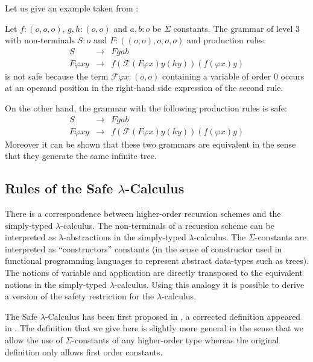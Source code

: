 Let us give an example taken from \cite{KNU02}:
\begin{exmp} Let $f:(o,o,o)$, $g,h:(o,o)$ and $a,b:o$ be $\Sigma$ constants.
 The grammar of level 3 with non-terminals $S:o$ and $F: ((o,o),o,o,o)$ and production rules:
\begin{eqnarray*}
    S &\rightarrow&  F g a b \\
    F \varphi x y &\rightarrow& f ( \mathcal{F} ( F \varphi x ) y (h y)) (f (\varphi x) y)
\end{eqnarray*}
is not safe because the term $\mathcal{F} \varphi x : (o,o)$ containing a variable of order $0$
occurs at an operand position in the right-hand side expression of the second rule.

On the other hand, the grammar with the following production rules is safe:
\begin{eqnarray*}
    S &\rightarrow&  F g a b \\
    F \varphi x y &\rightarrow& f ( \mathcal{F} ( F \varphi x ) y (h y)) (f (\varphi x) y)
\end{eqnarray*}
Moreover it can be shown that these two grammars are equivalent in the sense that they generate the same
infinite tree.
\end{exmp}


\subsection{Rules of the Safe $\lambda$-Calculus}

There is a correspondence between higher-order recursion schemes and
the simply-typed $\lambda$-calculus. The non-terminals of a
recursion scheme can be interpreted as $\lambda$-abstractions in the
simply-typed $\lambda$-calculus. The $\Sigma$-constants are
interpreted as ``constructors'' constants (in the sense of
constructor used in functional programming languages to represent
abstract data-types such as trees). The notions of variable and
application are directly transposed to the equivalent notions in the
simply-typed $\lambda$-calculus. Using this analogy it is possible
to derive a version of the safety restriction for the
$\lambda$-calculus.

The Safe $\lambda$-Calculus has been first proposed in
\cite{DBLP:conf/fossacs/AehligMO05}, a corrected definition appeared
in \cite{Ong2005}. The definition that we give here is slightly more
general in the sense that we allow the use of $\Sigma$-constants of
any higher-order type whereas the original definition only allows
first order constants.


